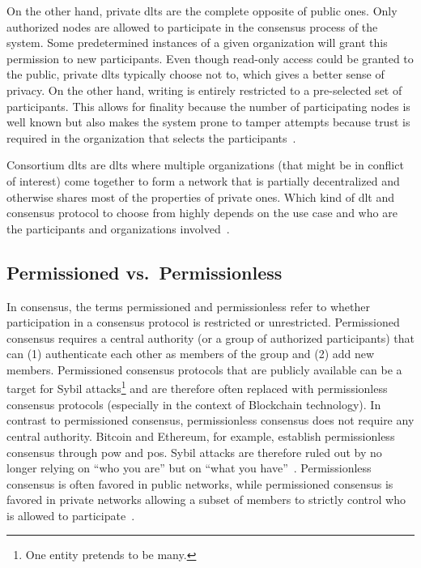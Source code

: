 On the other hand, private \glspl{dlt} are the complete opposite of public ones. Only authorized nodes are allowed to participate in the consensus process of the system. Some predetermined instances of a given organization will grant this permission to new participants. Even though read-only access could be granted to the public, private \glspl{dlt} typically choose not to, which gives a better sense of privacy. On the other hand, writing is entirely restricted to a pre-selected set of participants. This allows for finality because the number of participating nodes is well known but also makes the system prone to tamper attempts because trust is required in the organization that selects the participants~\cite{consensus_comparison_2019}.

Consortium \glspl{dlt} are \glspl{dlt} where multiple organizations (that might be in conflict of interest) come together to form a network that is partially decentralized and otherwise shares most of the properties of private ones. Which kind of \gls{dlt} and consensus protocol to choose from highly depends on the use case and who are the participants and organizations involved~\cite{consensus_comparison_2019}.


\subsection{Permissioned vs.\ Permissionless}
In consensus, the terms permissioned and permissionless refer to whether participation in a consensus protocol is restricted or unrestricted. Permissioned consensus requires a central authority (or a group of authorized participants) that can (1) authenticate each other as members of the group and (2) add new members. Permissioned consensus protocols that are publicly available can be a target for Sybil attacks\footnote{One entity pretends to be many.} and are therefore often replaced with permissionless consensus protocols (especially in the context of Blockchain technology). In contrast to permissioned consensus, permissionless consensus does not require any central authority. Bitcoin and Ethereum, for example, establish permissionless consensus through \gls{pow} and \gls{pos}. Sybil attacks are therefore ruled out by no longer relying on ``who you are'' but on ``what you have''~\cite{nakamoto2009,proof_of_stake}. Permissionless consensus is often favored in public networks, while permissioned consensus is favored in private networks allowing a subset of members to strictly control who is allowed to participate~\cite{consensus_comparison_2019}.


